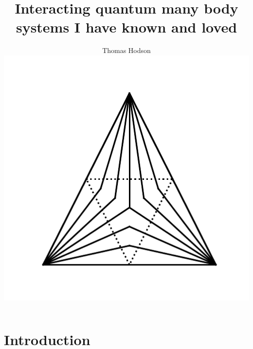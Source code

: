 \documentclass[a4paper,12pt]{report}
\begin{document}
\title{\LARGE {\bf Interacting quantum many body systems I have known and loved}\\
 \vspace*{6mm}
}

\author{Thomas Hodson\\\vspace{10mm}
\includegraphics[width=.4\textwidth,height=.4\textheight]{figure_code/logo/logo}
\vspace{-0.4\textheight}
\vspace{10mm}
}


\maketitle

\preface
{}
\begin{abstract}

\end{abstract}



\cleardoublepage
{}
\begin{acknowledgements}

\end{acknowledgements}

\body

\hypersetup{
  linkcolor  = urlblue,
  citecolor  = black,
  urlcolor   = urlblue,
  }

\hypertarget{chap:1-introduction}{\chapter{Introduction}}
\begin{refsection}

\printbibliography[heading=subbibintoc]
\end{refsection}
\end{document}
